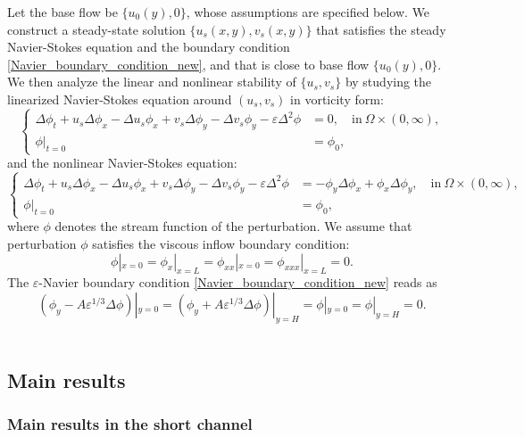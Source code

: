 \documentclass[reqno, 11pt]{amsart}
\theoremstyle{plain}
\theoremstyle{definition}
\theoremstyle{remark}
\numberwithin{equation}{section}
\begin{document}
Let the base flow be $\{u_0(y),0\}$, whose assumptions are specified below. We construct a steady-state solution $\{u_s(x,y), v_s(x,y)\}$ that satisfies the steady Navier-Stokes equation and the boundary condition \eqref{Navier_boundary_condition_new}, and that is close to base flow $\{u_0(y),0\}$. We then analyze the linear and nonlinear stability of $\{ u_s, v_s\}$ by studying the linearized Navier-Stokes equation around $(u_s,v_s)$ in vorticity form:
\begin{equation}\label{Linearized_NS}
\left\{\begin{aligned}
\Delta \phi_t + u_s \Delta \phi_x - \Delta u_s \phi_x + v_s \Delta \phi_y - \Delta v_s \phi_y - \varepsilon \Delta^2 \phi &= 0, \quad \mbox{in}~\Omega \times (0,\infty),\\
\phi|_{t=0} &= \phi_0,
\end{aligned}\right.
\end{equation}
and the nonlinear Navier-Stokes equation:
\begin{equation}\label{Nonlinear_NS}
\left\{\begin{aligned}
\Delta \phi_t + u_s \Delta \phi_x - \Delta u_s \phi_x + v_s \Delta \phi_y - \Delta v_s \phi_y - \varepsilon \Delta^2 \phi &= -\phi_y \Delta \phi_x + \phi_x \Delta \phi_y, \quad \mbox{in}~\Omega \times (0,\infty),\\
\phi|_{t=0} &= \phi_0,
\end{aligned}\right.
\end{equation}
where $\phi$ denotes the stream function of the perturbation. We assume that perturbation $\phi$ satisfies the viscous inflow boundary condition:
\begin{equation}\label{viscous_bc}
\phi|_{x=0} = \phi_x|_{x=L} = \phi_{xx}|_{x=0} = \phi_{xxx}|_{x = L} =  0.
\end{equation}
The $\varepsilon$-Navier boundary condition \eqref{Navier_boundary_condition_new} reads as
\begin{equation}\label{Navier_bc2}
(\phi_y - A\varepsilon^{1/3} \Delta \phi)|_{y=0} = (\phi_y + A\varepsilon^{1/3} \Delta \phi)|_{y=H}= \phi|_{y = 0} = \phi|_{y = H} =0.
\end{equation}\\

\subsection{Main results}

\subsubsection{Main results in the short channel}
\end{document}
